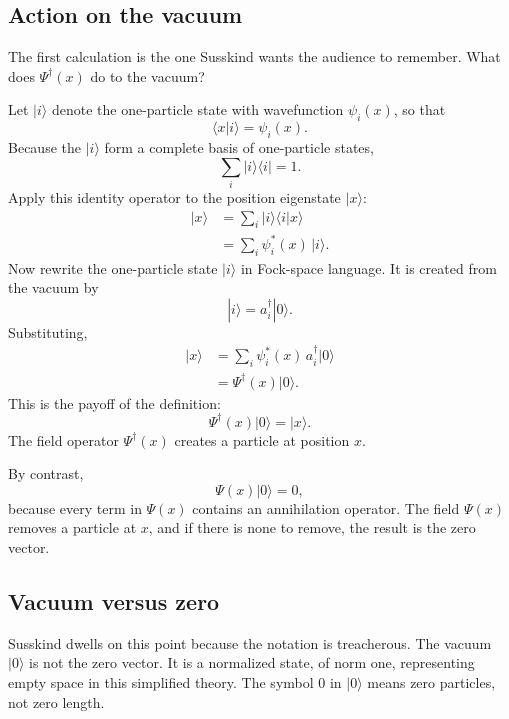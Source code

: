 \subsection{Action on the vacuum}

The first calculation is the one Susskind wants the audience to remember. What does \(\Psi^\dagger(x)\) do to the vacuum?

Let \(|i\rangle\) denote the one-particle state with wavefunction \(\psi_i(x)\), so that
\begin{equation}
\langle x|i\rangle=\psi_i(x).
\end{equation}
Because the \(|i\rangle\) form a complete basis of one-particle states,
\begin{equation}
\sum_i |i\rangle\langle i|=1.
\end{equation}
Apply this identity operator to the position eigenstate \(|x\rangle\):
\begin{align}
|x\rangle
&=
\sum_i |i\rangle\langle i|x\rangle \\
&=
\sum_i \psi_i^*(x)\,|i\rangle.
\end{align}
Now rewrite the one-particle state \(|i\rangle\) in Fock-space language. It is created from the vacuum by
\begin{equation}
|i\rangle=a_i^\dagger|0\rangle.
\end{equation}
Substituting,
\begin{align}
|x\rangle
&=
\sum_i \psi_i^*(x)\,a_i^\dagger|0\rangle \\
&=
\Psi^\dagger(x)|0\rangle.
\end{align}
This is the payoff of the definition:
\begin{equation}
\Psi^\dagger(x)|0\rangle=|x\rangle.
\end{equation}
The field operator \(\Psi^\dagger(x)\) creates a particle at position \(x\).

By contrast,
\begin{equation}
\Psi(x)|0\rangle=0,
\end{equation}
because every term in \(\Psi(x)\) contains an annihilation operator. The field \(\Psi(x)\) removes a particle at \(x\), and if there is none to remove, the result is the zero vector.

\subsection{Vacuum versus zero}

Susskind dwells on this point because the notation is treacherous. The vacuum \(|0\rangle\) is not the zero vector. It is a normalized state, of norm one, representing empty space in this simplified theory. The symbol \(0\) in \(|0\rangle\) means zero particles, not zero length.

